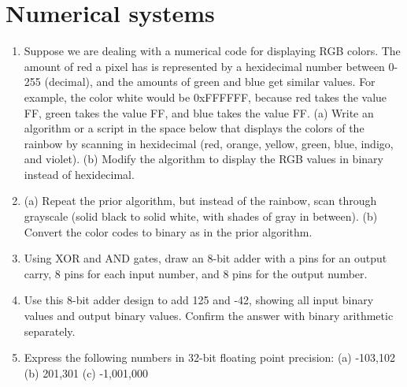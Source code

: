 \documentclass[10pt]{article}
\begin{document}
\section{Numerical systems}
\begin{enumerate}
\item Suppose we are dealing with a numerical code for displaying RGB colors.  The amount of red a pixel has is represented by a hexidecimal number between 0-255 (decimal), and the amounts of green and blue get similar values.  For example, the color white would be 0xFFFFFF, because red takes the value FF, green takes the value FF, and blue takes the value FF.  (a) Write an algorithm or a script in the space below that displays the colors of the rainbow by scanning in hexidecimal (red, orange, yellow, green, blue, indigo, and violet). (b) Modify the algorithm to display the RGB values in binary instead of hexidecimal.  \\ \vspace{3cm}
\item (a) Repeat the prior algorithm, but instead of the rainbow, scan through grayscale (solid black to solid white, with shades of gray in between). (b) Convert the color codes to binary as in the prior algorithm. \\ \vspace{3cm}
\item Using XOR and AND gates, draw an 8-bit adder with a pins for an output carry, 8 pins for each input number, and 8 pins for the output number. \\ \vspace{3cm}
\item Use this 8-bit adder design to add 125 and -42, showing all input binary values and output binary values.  Confirm the answer with binary arithmetic separately. \\ \vspace{3cm}
\item Express the following numbers in 32-bit floating point precision: (a) -103,102 (b) 201,301 (c) -1,001,000 \\ \vspace{2cm}
\end{enumerate}
\end{document}
